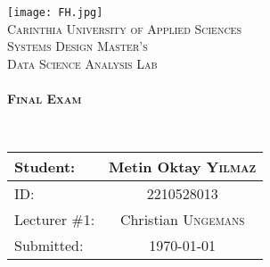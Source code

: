 \begin{titlepage}
    \begin{center}
        \texttt{[image: FH.jpg]}\\[1.5cm]

        \textsc{\LARGE Carinthia University of Applied Sciences}\\[1.5cm]

        \textsc{\Large Systems Design Master's}\\[1.5cm]
        \textsc{\Large Data Science Analysis Lab}\\[2.5cm]

        \HRule \\[1cm]

        { \LARGE \bfseries \textsc{Final Exam}}

        \HRule \\[1cm]

        \vspace{2.5cm}

        	\begin{table}[H]
        		\centering
        		\begin{tabular}{|l|c|}
        			\toprule
        			Student: & Metin Oktay \textsc{Yilmaz} \\
        			\midrule
        			ID: & 2210528013   	\\
        			Lecturer \#1: & Christian  \textsc{Ungemans}  \\
        			Submitted: & {\large \today}  	\\
        			\bottomrule
        		\end{tabular}
        	\end{table}
    \end{center}
\end{titlepage}